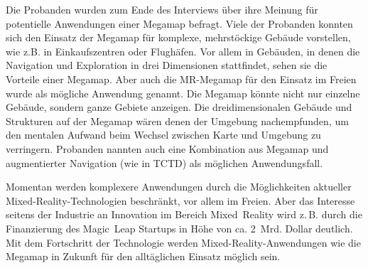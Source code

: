 Die Probanden wurden zum Ende des Interviews über ihre Meinung für potentielle Anwendungen einer Megamap befragt.
Viele der Probanden konnten sich den Einsatz der Megamap für komplexe, mehrstöckige Gebäude vorstellen, wie z.B. in Einkaufszentren oder Flughäfen.
Vor allem in Gebäuden, in denen die Navigation und Exploration in drei Dimensionen stattfindet, sehen sie die Vorteile einer Megamap.
Aber auch die MR-Megamap für den Einsatz im Freien wurde als mögliche Anwendung genannt.
Die Megamap könnte nicht nur einzelne Gebäude, sondern ganze Gebiete anzeigen.
Die dreidimensionalen Gebäude und Strukturen auf der Megamap wären denen der Umgebung nachempfunden, um den mentalen Aufwand beim Wechsel zwischen Karte und Umgebung zu verringern.
Probanden nannten auch eine Kombination aus Megamap und augmentierter Navigation (wie in TCTD) als möglichen Anwendungsfall.

Momentan werden komplexere Anwendungen durch die Möglichkeiten aktueller Mixed-Reality-Technologien beschränkt, vor allem im Freien.
Aber das Interesse seitens der Industrie an Innovation im Bereich Mixed~Reality wird z.\,B. durch die Finanzierung des Magic~Leap Startups in Höhe von ca. 2~Mrd. Dollar \parencite{Machkovech2017} deutlich.
Mit dem Fortschritt der Technologie werden Mixed-Reality-Anwendungen wie die Megamap in Zukunft für den alltäglichen Einsatz möglich sein.

%
\cleardoublepage
